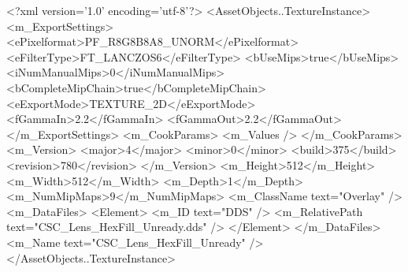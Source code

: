 <?xml version='1.0' encoding='utf-8'?>
<AssetObjects..TextureInstance>
  <m_ExportSettings>
    <ePixelformat>PF_R8G8B8A8_UNORM</ePixelformat>
    <eFilterType>FT_LANCZOS6</eFilterType>
    <bUseMips>true</bUseMips>
    <iNumManualMips>0</iNumManualMips>
    <bCompleteMipChain>true</bCompleteMipChain>
    <eExportMode>TEXTURE_2D</eExportMode>
    <fGammaIn>2.2</fGammaIn>
    <fGammaOut>2.2</fGammaOut>
  </m_ExportSettings>
  <m_CookParams>
    <m_Values />
  </m_CookParams>
  <m_Version>
    <major>4</major>
    <minor>0</minor>
    <build>375</build>
    <revision>780</revision>
  </m_Version>
  <m_Height>512</m_Height>
  <m_Width>512</m_Width>
  <m_Depth>1</m_Depth>
  <m_NumMipMaps>9</m_NumMipMaps>
  <m_ClassName text="Overlay" />
  <m_DataFiles>
    <Element>
      <m_ID text="DDS" />
      <m_RelativePath text="CSC_Lens_HexFill_Unready.dds" />
    </Element>
  </m_DataFiles>
  <m_Name text="CSC_Lens_HexFill_Unready" />
</AssetObjects..TextureInstance>
